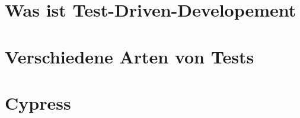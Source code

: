 \section{Was ist Test-Driven-Developement}


\section{Verschiedene Arten von Tests}


\section{Cypress}
